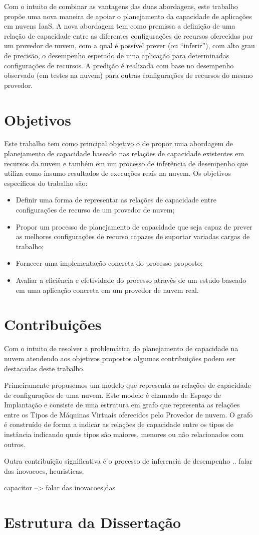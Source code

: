 Com o intuito de combinar as vantagens das duas abordagens, este trabalho
propõe uma nova maneira de apoiar o planejamento da capacidade de aplicações
em nuvens IaaS. A nova abordagem tem como premissa a definição de uma relação 
de capacidade entre as diferentes configurações de recursos oferecidas por um provedor 
de nuvem, com a qual é possível prever (ou ``inferir''), com alto grau de precisão, 
o desempenho esperado de uma aplicação para determinadas configurações de recursos. A predição 
é realizada com base no desempenho observado (em testes na nuvem) para outras
configurações de recursos do mesmo provedor.

\section{Objetivos}

Este trabalho tem como principal objetivo o de propor uma abordagem de
planejamento de capacidade baseado nas relações de capacidade existentes em
recursos da nuvem e também em um processo de inferência de desempenho 
que utiliza como insumo resultados de execuções reais na nuvem. Os objetivos
específicos do trabalho são:

\begin{itemize}
  \item Definir uma forma de representar as relações de capacidade entre
  configurações de recurso de um provedor de nuvem;
  \item Propor um processo de planejamento de capacidade que seja capaz de 
  prever as melhores configurações de recurso capazes de suportar variadas
  cargas de trabalho;
  \item Fornecer uma implementação concreta do processo proposto;
  \item Avaliar a eficiência e efetividade do processo através de um estudo
  baseado em uma aplicação concreta em um provedor de nuvem real.
\end{itemize}
 
\section{Contribuições}

Com o intuito de resolver a problemática do planejamento de capacidade na nuvem
atendendo aos objetivos propostos algumas contribuições podem ser destacadas
deste trabalho.

Primeiramente propusemos um modelo que representa as relações de capacidade de
configurações de uma nuvem. Este modelo é chamado de Espaço de Implantação
e consiste de uma estrutura em grafo que representa as relações entre os
Tipos de Máquinas Virtuais oferecidos pelo Provedor de nuvem. O grafo é
construído de forma a indicar as relações de capacidade entre os tipos de
instância indicando quais tipos são maiores, menores ou não relacionados com
outros.

Outra contribuição significativa é o processo de inferencia de desempenho ..
falar das inovacoes, heuristicas, 

capacitor --> falar das inovacoes,das



\section{Estrutura da Dissertação}
